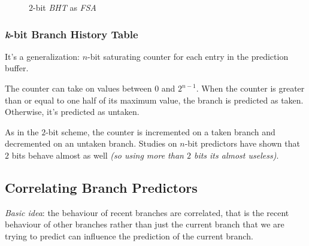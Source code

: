 \documentclass[english]{article}
\begin{document}
\begin{figure}[htbp]
  \bigskip
  \centering


  \caption{\(2\)-bit \textit{BHT} as \textit{FSA}}
  \label{fig:2-bit-BHT-as-FSA}
  \bigskip
\end{figure}

\subsubsection{\textit{k}-bit Branch History Table}

It's a generalization: \(n\)-bit saturating counter for each entry in the prediction buffer.

The counter can take on values between \(0\) and \(2^{n-1}\).
When the counter is greater than or equal to one half of its maximum value, the branch is predicted as taken.
Otherwise, it's predicted as untaken.

As in the \(2\)-bit scheme, the counter is incremented on a taken branch and decremented on an untaken branch.
Studies on \(n\)-bit predictors have shown that \(2\) bits behave almost as well \textit{(so using more than \(2\) bits its almost useless)}.

\subsection{Correlating Branch Predictors}

\textit{Basic idea}: the behaviour of recent branches are correlated, that is the recent behaviour of other branches rather than just the current branch that we are trying to predict can influence the prediction of the current branch.
\end{document}
